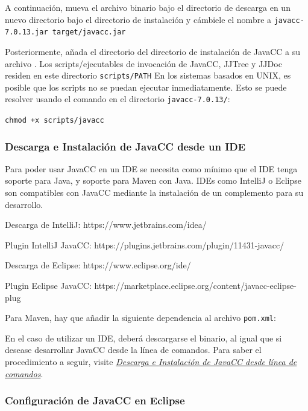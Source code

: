 A continuación, mueva el archivo binario bajo el directorio de descarga en un nuevo directorio bajo el directorio de instalación y cámbiele el nombre a \lstinline|javacc-7.0.13.jar target/javacc.jar|


Posteriormente, añada el directorio del directorio de instalación de JavaCC a su archivo . Los scripts/ejecutables de invocación de JavaCC, JJTree y JJDoc residen en este directorio \lstinline|scripts/PATH|
En los sistemas basados en UNIX, es posible que los scripts no se puedan ejecutar inmediatamente. Esto se puede resolver usando el comando en el directorio \lstinline|javacc-7.0.13/|:

\lstinline|chmod +x scripts/javacc|

\subsubsection{Descarga e Instalación de JavaCC desde un IDE}

Para poder usar JavaCC en un IDE se necesita como mínimo que el IDE tenga soporte para Java, y soporte para Maven con Java. IDEs como IntelliJ o Eclipse son compatibles con JavaCC mediante la instalación de un complemento para su desarrollo.

 Descarga de IntelliJ: https://www.jetbrains.com/idea/
 
 Plugin IntelliJ JavaCC: https://plugins.jetbrains.com/plugin/11431-javacc/
 
 Descarga de Eclipse: https://www.eclipse.org/ide/
 
 Plugin Eclipse JavaCC: https://marketplace.eclipse.org/content/javacc-eclipse-\\plug 

Para Maven, hay que añadir la siguiente dependencia al archivo \lstinline|pom.xml|:


\lstset{inputencoding=utf8/latin1}


En el caso de utilizar un IDE, deberá descargarse el binario, al igual que si desease desarrollar JavaCC desde la línea de comandos. Para saber el procedimiento a seguir, visite \href{sec:descargaeinstalaciondejavaccdesdelineadecomandos}{\textit{Descarga e Instalación de JavaCC desde línea de comandos}}.

\subsubsection{Configuración de JavaCC en Eclipse}

